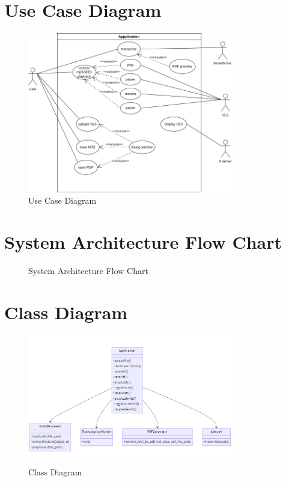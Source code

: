 \documentclass{article}
\begin{document}
\section{Use Case Diagram}
\begin{figure}[h!]
    \centering
    \includegraphics[width=0.8\textwidth]{../diagrams/use_case.png}
    \caption{Use Case Diagram}
    \label{fig:use_case}
\end{figure}

\section{System Architecture Flow Chart}
\begin{figure}[h!]
    \centering
    \caption{System Architecture Flow Chart}
    \label{fig:system_architecture}
\end{figure}

\section{Class Diagram}
\begin{figure}[h!]
    \centering
    \includegraphics[width=0.8\textwidth]{../diagrams/class_diagram.png}
    \caption{Class Diagram}
    \label{fig:class_diagram}
\end{figure}
\end{document}
